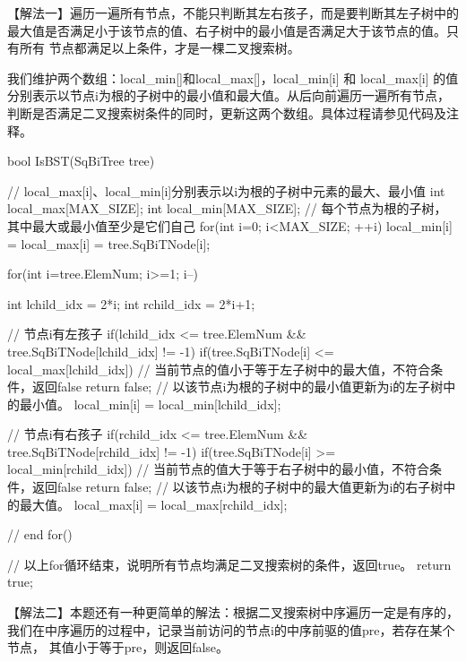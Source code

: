 【解法一】遍历一遍所有节点，不能只判断其左右孩子，而是要判断其左子树中的最大值是否满足小于该节点的值、右子树中的最小值是否满足大于该节点的值。只有所有
节点都满足以上条件，才是一棵二叉搜索树。

我们维护两个数组：local\_min[]和local\_max[]，local\_min[i] 和 local\_max[i] 的值分别表示以节点i为根的子树中的最小值和最大值。从后向前遍历一遍所有节点，
判断是否满足二叉搜索树条件的同时，更新这两个数组。具体过程请参见代码及注释。

\begin{cppcode}
    bool IsBST(SqBiTree tree) {
        // local_max[i]、local_min[i]分别表示以i为根的子树中元素的最大、最小值
        int local_max[MAX_SIZE];
        int local_min[MAX_SIZE];
        // 每个节点为根的子树，其中最大或最小值至少是它们自己
        for(int i=0; i<MAX_SIZE; ++i) {
            local_min[i] = local_max[i] = tree.SqBiTNode[i];
        }

        for(int i=tree.ElemNum; i>=1; i--) {
            int lchild_idx = 2*i;
            int rchild_idx = 2*i+1;

            // 节点i有左孩子
            if(lchild_idx <= tree.ElemNum && tree.SqBiTNode[lchild_idx] != -1) {
                if(tree.SqBiTNode[i] <= local_max[lchild_idx]) {    // 当前节点的值小于等于左子树中的最大值，不符合条件，返回false
                    return false;
                }
                // 以该节点i为根的子树中的最小值更新为i的左子树中的最小值。
                local_min[i] = local_min[lchild_idx];
            }

            // 节点i有右孩子
            if(rchild_idx <= tree.ElemNum && tree.SqBiTNode[rchild_idx] != -1) {
                if(tree.SqBiTNode[i] >= local_min[rchild_idx]) {    // 当前节点的值大于等于右子树中的最小值，不符合条件，返回false
                    return false;
                }
                // 以该节点i为根的子树中的最大值更新为i的右子树中的最大值。
                local_max[i] = local_max[rchild_idx];
            }
        } // end for()

        // 以上for循环结束，说明所有节点均满足二叉搜索树的条件，返回true。
        return true;
    }
\end{cppcode}


\vspace{\baselineskip}

【解法二】本题还有一种更简单的解法：根据二叉搜索树中序遍历一定是有序的，我们在中序遍历的过程中，记录当前访问的节点i的中序前驱的值pre，若存在某个节点，
其值小于等于pre，则返回false。

